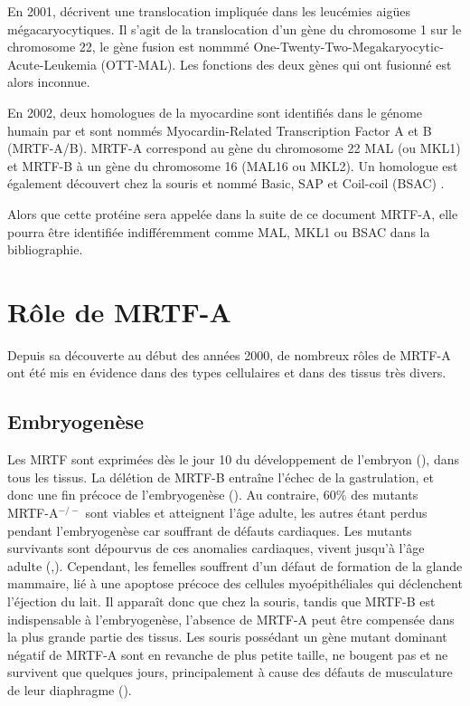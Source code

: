 \documentclass{article}
\begin{document}
En 2001, \cite{mercher_involvement_2001} 
décrivent une translocation impliquée dans les leucémies aigües mégacaryocytiques. 
Il s'agit de la translocation d'un gène du chromosome 1 sur le chromosome 22, le gène fusion est nommmé One-Twenty-Two-Megakaryocytic-Acute-Leukemia (OTT-MAL). 
Les fonctions des deux gènes qui ont fusionné est alors inconnue. 

En 2002, deux homologues de la myocardine sont identifiés dans le génome humain par \cite{wang_potentiation_2002} et sont nommés Myocardin-Related Transcription Factor A et B (MRTF-A/B).
MRTF-A correspond au gène du chromosome 22 MAL (ou MKL1) et MRTF-B à un gène du chromosome 16 (MAL16 ou MKL2). 
Un homologue est également découvert chez la souris et nommé Basic, SAP et Coil-coil (BSAC) \parencite{sasazuki_identification_2002}. 

Alors que cette protéine sera appelée dans la suite de ce document MRTF-A, elle pourra être identifiée indifféremment comme MAL, MKL1 ou BSAC dans la bibliographie. 

\section{Rôle de MRTF-A}
Depuis sa découverte au début des années 2000, de nombreux rôles de MRTF-A ont été mis en évidence dans des types cellulaires et dans des tissus très divers. 
\subsection{Embryogenèse}
Les MRTF sont exprimées dès le jour 10 du développement de l'embryon (\cite{wang_potentiation_2002}), dans tous les tissus. La délétion de MRTF-B entraîne l'échec de la gastrulation, et donc une fin précoce de l'embryogenèse (\cite{kalita_mkls:_2012}). Au contraire, 60\% des mutants MRTF-A$^{-/-}$ sont viables et atteignent l'âge adulte, les autres étant perdus pendant l'embryogenèse car souffrant de défauts cardiaques. Les mutants survivants sont dépourvus de ces anomalies cardiaques, vivent jusqu'à l'âge adulte (\cite{li_requirement_2006},\cite{sun_acute_2006}). Cependant, les femelles souffrent d'un défaut de formation de la glande mammaire,  lié à une apoptose précoce des cellules myoépithéliales qui déclenchent l'éjection du lait. Il apparaît donc que chez la souris, tandis que MRTF-B est indispensable à l'embryogenèse, l'absence de MRTF-A peut être compensée dans la plus grande partie des tissus. 
Les souris possédant un gène mutant dominant négatif de MRTF-A sont en revanche de plus petite taille, ne bougent pas et ne survivent que quelques jours, principalement à cause des défauts de musculature de leur diaphragme (\cite{li_requirement_2005}). 
\end{document}
